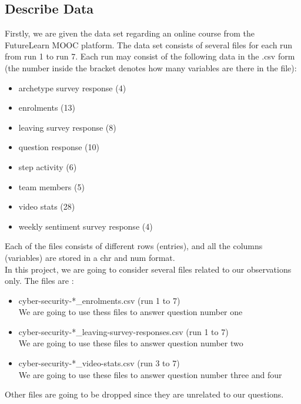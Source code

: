 \documentclass[12pt,]{article}
\providecommand{\tightlist}{%
\setlength{\itemsep}{0pt}\setlength{\parskip}{0pt}}
\begin{document}
\hypertarget{describe-data}{%
\subsection{Describe Data}\label{describe-data}}

Firstly, we are given the data set regarding an online course from the
FutureLearn MOOC platform. The data set consists of several files for
each run from run 1 to run 7. Each run may consist of the following data
in the .csv form (the number inside the bracket denotes how many
variables are there in the file):

\begin{itemize}
\tightlist
\item
  archetype survey response (4)
\item
  enrolments (13)
\item
  leaving survey response (8)
\item
  question response (10)
\item
  step activity (6)
\item
  team members (5)
\item
  video stats (28)
\item
  weekly sentiment survey response (4)
\end{itemize}

\noindent Each of the files consists of different rows (entries), and
all the columns (variables) are stored in a chr and num format.\\
\hfill\break In this project, we are going to consider several files
related to our observations only. The files are :

\begin{itemize}
\tightlist
\item
  cyber-security-*\_enrolments.csv (run 1 to 7)\\
  We are going to use thess files to answer question number one
\item
  cyber-security-*\_leaving-survey-responses.csv (run 1 to 7)\\
  We are going to use these files to answer question number two
\item
  cyber-security-*\_video-stats.csv (run 3 to 7)\\
  We are going to use these files to answer question number three and
  four
\end{itemize}

\noindent Other files are going to be dropped since they are unrelated
to our questions.
\end{document}
